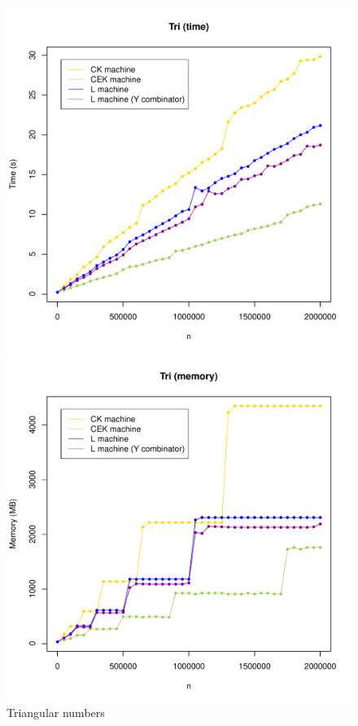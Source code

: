 \documentclass[a4paper]{article}
\begin{document}
\begin{figure}[H]
\centering
\includegraphics[width=0.7\linewidth]{figs/tri-times.pdf}

\includegraphics[width=0.7\linewidth]{figs/tri-mem.pdf}
\caption{Triangular numbers}\label{fig:tri-graphs}
\end{figure}
\newpage
\end{document}

